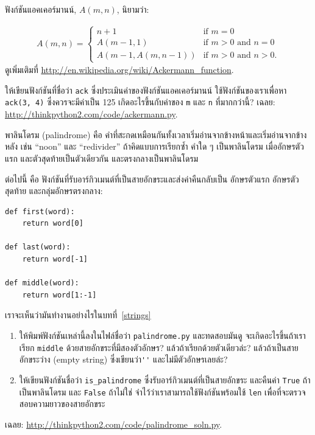 \begin{exercise}
\label{ackermann}

ฟังก์ชันแอคเคอร์มานน์, $A(m, n)$, นิยามว่า:

\begin{eqnarray*}
A(m, n) = \begin{cases} 
              n+1 & \mbox{if } m = 0 \\ 
        A(m-1, 1) & \mbox{if } m > 0 \mbox{ and } n = 0 \\ 
A(m-1, A(m, n-1)) & \mbox{if } m > 0 \mbox{ and } n > 0.
\end{cases} 
\end{eqnarray*}
%
ดูเพิ่มเติมที่ \url{http://en.wikipedia.org/wiki/Ackermann_function}.

ให้เขียนฟังก์ชันที่ชื่อว่า {\tt ack} ซึ่งประเมินค่าของฟังก์ชันแอคเคอร์มานน์ ใช้ฟังก์ชันของเราเพื่อหา
{\tt ack(3, 4)} ซึ่งควรจะมีค่าเป็น 125  เกิดอะไรขึ้นกับค่าของ {\tt m} และ {\tt n} ที่มากกว่านี้?
เฉลย: \url{http://thinkpython2.com/code/ackermann.py}.

\end{exercise}


\begin{exercise}
\label{palindrome}

พาลินโดรม (palindrome) คือ คำที่สะกดเหมือนกันทั้งเวลาเริ่มอ่านจากข้างหน้าและเริ่มอ่านจากข้างหลัง
เช่น ``noon'' และ ``redivider''  ถ้าคิดแบบการเรียกซ้ำ คำใด ๆ เป็นพาลินโดรม เมื่ออักษรตัวแรก
และตัวสุดท้ายเป็นตัวเดียวกัน และตรงกลางเป็นพาลินโดรม

ต่อไปนี้ คือ ฟังก์ชันที่รับอาร์กิวเมนต์ที่เป็นสายอักขระและส่งค่าคืนกลับเป็น อักษรตัวแรก อักษรตัวสุดท้าย และกลุ่มอักษรตรงกลาง:

\begin{verbatim}
def first(word):
    return word[0]

def last(word):
    return word[-1]

def middle(word):
    return word[1:-1]
\end{verbatim}
%
เราจะเห็นว่ามันทำงานอย่างไรในบทที่~\ref{strings}

\begin{enumerate}

\item ให้พิมพ์ฟังก์ชันเหล่านี้ลงในไฟล์ชื่อว่า {\tt palindrome.py} และทดสอบมันดู
จะเกิดอะไรขึ้นถ้าเราเรียก {\tt middle} ด้วยสายอักขระที่มีสองตัวอักษร? แล้วถ้าเรียกด้วยตัวเดียวล่ะ?
แล้วถ้าเป็นสายอักขระว่าง (empty string) ซึ่งเขียนว่า\verb"''" และไม่มีตัวอักษรเลยล่ะ?

\item ให้เขียนฟังก์ชันชื่อว่า \verb"is_palindrome" ซึ่งรับอาร์กิวเมนต์ที่เป็นสายอักขระ และคืนค่า {\tt True} 
ถ้าเป็นพาลินโดรม และ {\tt False} ถ้าไม่ใช่  จำไว้ว่าเราสามารถใช้ฟังก์ชันพร้อมใช้ {\tt len} 
เพื่อที่จะตรวจสอบความยาวของสายอักขระ

\end{enumerate}

เฉลย: \url{http://thinkpython2.com/code/palindrome_soln.py}.

\end{exercise}


